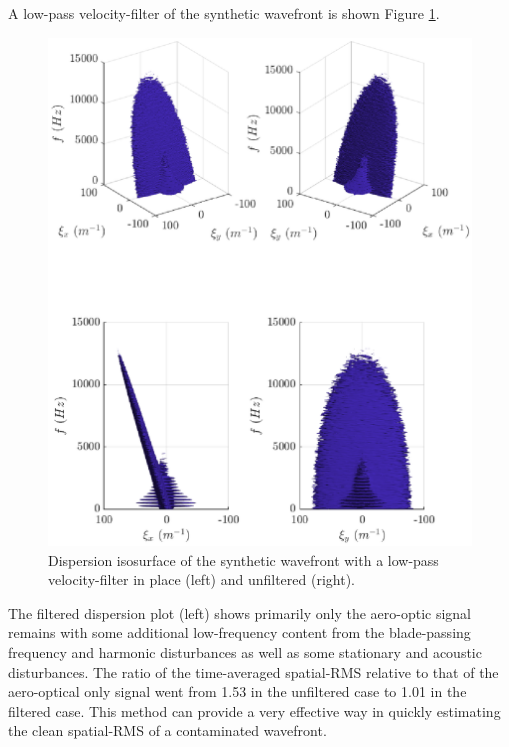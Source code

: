 A low-pass velocity-filter of the synthetic wavefront is shown Figure \ref{fig:04_filter_velocity}.
\begin{figure}
  \centering
  \includegraphics{../matlab/04_basic_filtering/filter_velocity.eps}
  \caption{Dispersion isosurface of the synthetic wavefront with a low-pass velocity-filter in place (left) and unfiltered (right).}
  \label{fig:04_filter_velocity}
\end{figure}
The filtered dispersion plot (left) shows primarily only the aero-optic signal remains with some additional low-frequency content from the blade-passing frequency and harmonic disturbances as well as some stationary and acoustic disturbances.
The ratio of the time-averaged spatial-RMS relative to that of the aero-optical only signal went from 1.53 in the unfiltered case to 1.01 in the filtered case.
This method can provide a very effective way in quickly estimating the clean spatial-RMS of a contaminated wavefront.

